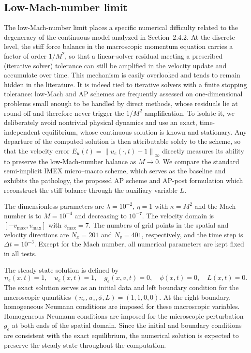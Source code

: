 \documentclass[pdflatex,final,10pt]{article}
\newcommand{\Fabrice}[1]{#1}
\begin{document}
\subsection{Low-Mach-number limit}
\Fabrice{
The low-Mach-number limit places a specific numerical difficulty related to the degeneracy of the continuous model
analyzed in Section~2.4.2. At the discrete level, the stiff force balance in the macroscopic momentum equation carries a factor of order $1/M^2$, so that a linear-solver residual meeting a prescribed (iterative solver) tolerance can still be amplified in the velocity update and accumulate over time. This mechanism is easily overlooked and tends to remain hidden in the literature. It is indeed tied to iterative solvers with a finite stopping tolerance: low-Mach and AP schemes are frequently assessed on one-dimensional problems small enough to be handled by direct methods, whose residuals lie at round-off and therefore never trigger the $1/M^2$ amplification. To isolate it, we deliberately avoid nontrivial physical dynamics and use an exact, time-independent equilibrium, whose continuous solution is known and stationary. Any departure of the computed solution is then attributable solely to the scheme, so that the velocity error $E_u(t)=\left\|u_e(\cdot,t)-1\right\|_{\infty}$ directly measures its ability to preserve the low-Mach-number balance as $M \to 0$. We compare the standard semi-implicit IMEX micro--macro scheme, which serves as the baseline and exhibits the pathology, the proposed AP scheme and AP-post formulation which reconstruct the stiff balance through the auxiliary variable $L$.}

The dimensionless parameters \Fabrice{are $ \lambda=10^{-2}$,  $\eta=1$ with $\kappa=M^2$ and the Mach number is to $M=10^{-4}$ and decreasing to  $10^{-7}$.} The velocity domain is $[-v_{\max},v_{\max}]$ with $v_{\max}=7$. The numbers of grid points in the spatial and velocity directions are $N_x=201$ and $N_v=401$, respectively, and the time step is $\Delta t=10^{-3}$. Except for the Mach number, all numerical parameters are kept fixed in all tests.

\Fabrice{The steady state solution is defined by 
\begin{equation*}
    n_e(x,t)=1,
    \quad u_e(x,t)=1,
    \quad g_e(x,v,t)=0,
    \quad \phi(x,t)=0,
    \quad L(x,t)=0.
\end{equation*}
The exact solution serves as an initial data and left boundary condition for the macroscopic quantities $(n_e,u_e,\phi,L)=(1,1,0,0)$}. 
At the right boundary, homogeneous Neumann conditions are imposed for these macroscopic variables. Homogeneous Neumann conditions are imposed for the microscopic perturbation $g_e$ at both ends of the spatial domain. Since the initial and boundary conditions are consistent with the exact equilibrium, \Fabrice{the numerical solution is expected to} preserve the steady state throughout the computation.
\end{document}
